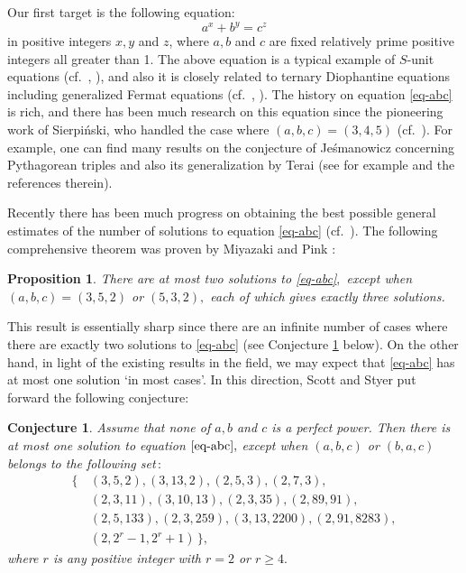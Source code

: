 \documentclass[11pt]{amsart}
\newtheorem{prop}{Proposition}[section]
\newtheorem{conj}{Conjecture}
\numberwithin{equation}{section}
\begin{document}
Our first target is the following equation:
\begin{equation} \label{eq-abc}
a^x+b^y=c^z
\end{equation}
in positive integers $x,y$ and $z$, where $a,b$ and $c$ are fixed relatively prime positive integers all greater than 1.
The above equation is a typical example of $S$-unit equations (cf.~\cite[Sec.\,12]{ShTi}, \cite[Chs.\,\,4 to 6]{EvGy}), and also it is closely related to ternary Diophantine equations including generalized Fermat equations (cf.~\cite{BeMihSi}, \cite[Ch.\,14]{Co}).
The history on equation \eqref{eq-abc} is rich, and there has been much research on this equation since the pioneering work of Sierpi\'nski, who handled the case where $(a,b,c)=(3,4,5)$ (cf.~\cite{Sie}).
For example, one can find many results on the conjecture of Je\'smanowicz concerning Pythagorean triples and also its generalization by Terai (see for example \cite{CiMi, Lu3, Mi_aa18} and the references therein).

Recently there has been much progress on obtaining the best possible general estimates of the number of solutions to equation \eqref{eq-abc} (cf.~\cite{ScSt, HuLe2, HuLe3, MP}).
The following comprehensive theorem was proven by Miyazaki and Pink \cite{MP}:
%
\begin{prop}\label{prop-MP}
There are at most two solutions to \eqref{eq-abc}$,$ except when $(a,b,c)=(3,5,2)$ or $(5,3,2),$ each of which gives exactly three solutions.
\end{prop} 
%
This result is essentially sharp since there are an infinite number of cases where there are exactly two solutions to \eqref{eq-abc} (see Conjecture \ref{conj-atmost1} below).
On the other hand, in light of the existing results in the field, we may expect that \eqref{eq-abc} has at most one solution `in most cases'.
In this direction, Scott and Styer \cite{ScSt} put forward the following conjecture:

%
\begin{conj} \label{conj-atmost1}
Assume that none of $a,b$ and $c$ is a perfect power.
Then there is at most one solution to equation $\eqref{eq-abc},$ except when $(a,b,c)$ or $(b,a,c)$ belongs to the following set\,$:$
\begin{align*}\label{excep-set}
\{ \,&(3,5,2),(3,13,2),(2,5,3),(2,7,3),\\
&(2,3,11),(3,10,13),(2,3,35),(2,89,91),\nonumber\\
&(2,5,133),(2,3,259),(3,13,2200),(2,91,8283),\nonumber\\
&(2,2^r-1,2^r+1)\, \},\nonumber
\end{align*}
where $r$ is any positive integer with $r=2$ or $r \ge 4.$
\end{conj}
%
\end{document}
